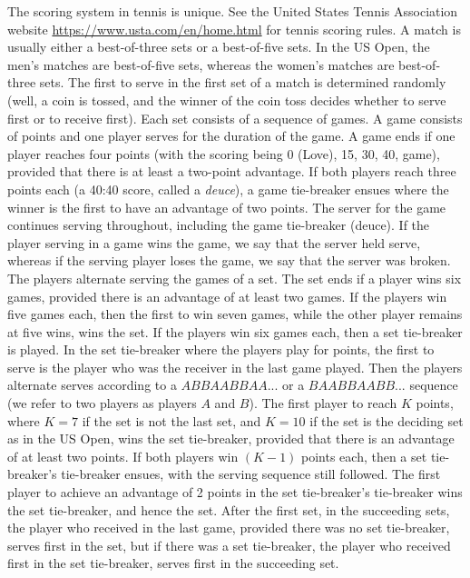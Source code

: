 \documentclass[11pt]{article}
\theoremstyle{plain}
\theoremstyle{definition}
\begin{document}
The scoring system in tennis is unique. See the United States Tennis Association website 
%
{\url{https://www.usta.com/en/home.html}}
%
for tennis scoring rules. A match is usually either a best-of-three sets or a best-of-five sets. In the US Open, the men's matches are best-of-five sets, whereas the women's matches are best-of-three sets. The first to serve in the first set of a match is determined randomly (well, a coin is tossed, and the winner of the coin toss decides whether to serve first or to receive first). Each set consists of a sequence of games. A game consists of points and one player serves for the duration of the game. A game ends if one player reaches four points (with the scoring being 0 (Love), 15, 30, 40, game), provided that there is at least a two-point advantage. If both players reach three points each (a 40:40 score, called a {\em deuce}), a game tie-breaker ensues where the winner is the first to have an advantage of two points. The server for the game continues serving throughout, including the game tie-breaker (deuce). 
If the player serving in a game wins the game, we say that the server held serve, whereas if the serving player loses the game, we say that the server was broken.
%
The players alternate serving the games of a set. The set ends if a player wins six games, provided there is an advantage of at least two games. If the players win five games each, then the first to win seven games, while the other player remains at five wins, wins the set. If the players win six games each, then a set tie-breaker is played. In the set tie-breaker where the players play for points, the first to serve is the player who was the receiver in the last game played. Then the players alternate serves according to a $ABBAABBAA...$ or a $BAABBAABB...$ sequence (we refer to two players as players $A$ and $B$). The first player to reach $K$ points, where $K = 7$ if the set is not the last set, and $K=10$ if the set is the deciding set as in the US Open, wins the set tie-breaker, provided that there is an advantage of at least two points. If both players win $(K-1)$ points each, then a set tie-breaker's tie-breaker ensues, with the serving sequence still followed. The first player to achieve an advantage of 2 points in the set tie-breaker's tie-breaker wins the set tie-breaker, and hence the set. 
%
After the first set, in the succeeding sets, the player who received in the last game, provided there was no set tie-breaker, serves first in the set, but if there was a set tie-breaker, the player who received first in the set tie-breaker, serves first in the succeeding set.
\end{document}
